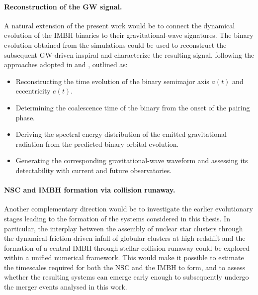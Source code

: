 \documentclass[12pt,twoside,openany]{book}
\begin{document}
\paragraph{Reconstruction of the GW signal.}
A natural extension of the present work would be to connect the dynamical evolution of the IMBH binaries to their gravitational-wave signatures. The binary evolution obtained from the simulations could be used to reconstruct the subsequent GW-driven inspiral and characterize the resulting signal, following the approaches adopted in \cite{Mannerkoski_2019} and \cite{Keitaanranta_2026}, outlined as:
\begin{itemize}
\item Reconstructing the time evolution of the binary semimajor axis $a(t)$ and eccentricity $e(t)$.
\item Determining the coalescence time of the binary from the onset of the pairing phase.
\item Deriving the spectral energy distribution of the emitted gravitational radiation from the predicted binary orbital evolution.
\item Generating the corresponding gravitational-wave waveform and assessing its detectability with current and future observatories.
\end{itemize}





\paragraph{NSC and IMBH formation via collision runaway.}
Another complementary direction would be to investigate the earlier evolutionary stages leading to the formation of the systems considered in this thesis. In particular, the interplay between the assembly of nuclear star clusters through the dynamical-friction-driven infall of globular clusters at high redshift \parencite{Khan_2026} and the formation of a central IMBH through stellar collision runaway could be explored within a unified numerical framework. This would make it possible to estimate the timescales required for both the NSC and the IMBH to form, and to assess whether the resulting systems can emerge early enough to subsequently undergo the merger events analysed in this work.
\end{document}
